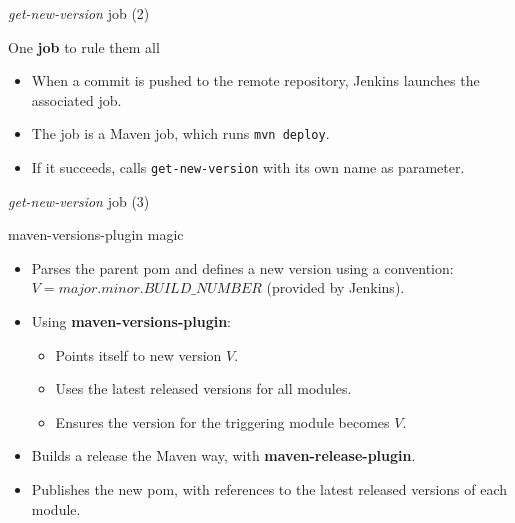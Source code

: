 \documentclass[presentation,c]{beamer}
\begin{document}
{
\begin{frame}[label=sec-7-4]{\textit{get-new-version} job (2)}

\begin{block}{One \textbf{job} to rule them all}

\begin{itemize}
\item When a commit is pushed to the remote repository, Jenkins launches the associated job.
\item The job is a Maven job, which runs \texttt{mvn deploy}.
\item If it succeeds, calls \texttt{get-new-version} with its own name as parameter.
\end{itemize}
\end{block}
\end{frame}
} %

{
\begin{frame}[label=sec-7-5]{\textit{get-new-version} job (3)}

\begin{block}{maven-versions-plugin magic}

\begin{itemize}
\item Parses the parent pom and defines a new version using a convention: $V = major.minor.BUILD\_NUMBER$ (provided by Jenkins).
\item Using \textbf{maven-versions-plugin}:
\begin{itemize}
\item Points itself to new version $V$.
\item Uses the latest released versions for all modules.
\item Ensures the version for the triggering module becomes $V$.
\end{itemize}
\item Builds a release the Maven way, with \textbf{maven-release-plugin}.
\item Publishes the new pom, with references to the latest released versions of each module.
\end{itemize}
\end{block}
\end{frame}
} %
\end{document}
